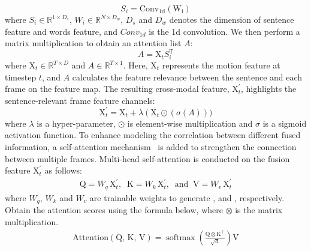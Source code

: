 \documentclass[10pt,twocolumn,letterpaper]{article}
\begin{document}
\begin{equation}
    S_i = \operatorname{Conv_{1d}(W_i)}
\end{equation}
where $S_i \in \mathbb{R}^{1 \times D_s}$, $W_i \in \mathbb{R}^{N \times D_w}$, $D_s$ and $D_w$ denotes the dimension of sentence feature and words feature, and $Conv_{1d}$ is the 1d convolution. 
We then perform a matrix multiplication to obtain an attention list $A$:
\begin{equation}
    A =\text{X}_t S_i^\mathrm{T}
\end{equation}
where $\text{X}_t \in \mathbb{R}^{T \times D}$ and $A \in \mathbb{R}^{T \times 1}$. 
Here, $\text{X}_t$ represents the motion feature at timestep $t$, and $A$ calculates the feature relevance between the sentence and each frame on the feature map. The resulting cross-modal feature, $\text{X}_t^{\prime}$, highlights the sentence-relevant frame feature channels:
\begin{equation}
    \text{X}_t^{\prime} = \text{X}_t + \lambda (\text{X}_t \odot \operatorname (\sigma(A)))
\end{equation}
where $\lambda$ is a hyper-parameter, $\odot $ is element-wise multiplication and $\sigma$ is a sigmoid activation function. 
To enhance modeling the correlation between different fused information, a self-attention mechanism~\cite{vaswani2017attention} is added to strengthen the connection between multiple frames. Multi-head self-attention is conducted on the fusion feature $\text{X}_t^{\prime}$ as follows:
\begin{equation}
\begin{aligned}
    \text{Q} = W_q\,  \text{X}_t^{\prime},\;\;
    \text{K} = W_k\,  \text{X}_t^{\prime},\; \operatorname{and}\;
    \text{V} = W_v\,  \text{X}_t^{\prime} 
\end{aligned}
\end{equation}
where $W_q$, $W_k$ and $W_v$ are trainable weights to generate ,  and , respectively. Obtain the attention scores using the formula below, where $\otimes$ is the matrix multiplication.
\begin{equation}
\begin{aligned}
    \operatorname{Attention(\text{Q, K, V})}=\operatorname{softmax}(\frac{\text{Q}\otimes \text{K}^{\top}}{\sqrt{d}} )\text{V}
\end{aligned}
    \label{attention}
\end{equation}
\end{document}
